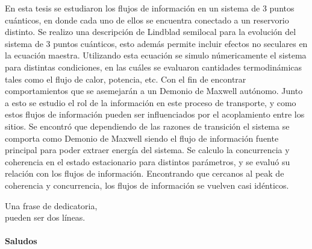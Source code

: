 \documentclass[
	spanish, %
	letterpaper, oneside
]{book}
\begin{document}
\templatePortrait

\templatePagecfg

\begin{abstractd}
	En esta tesis se estudiaron los flujos de información en un sistema de 3 puntos cuánticos, en donde cada uno de ellos se encuentra conectado a un reservorio distinto. Se realizo una descripción de Lindblad semilocal para la evolución del sistema de 3 puntos cuánticos, esto además permite incluir efectos no seculares en la ecuación maestra. Utilizando esta ecuación se simulo númericamente el sistema para distintas condiciones, en las cuáles se evaluaron cantidades termodinámicas tales como el flujo de calor, potencia, etc. Con el fin de encontrar comportamientos que se asemejarán a un Demonio de Maxwell autónomo. Junto a esto se estudio el rol de la información en este proceso de transporte, y como estos flujos de información pueden ser influenciados por el acoplamiento entre los sitios. Se encontró que dependiendo de las razones de transición el sistema se comporta como Demonio de Maxwell siendo el flujo de información fuente principal para poder extraer energía del sistema. Se calculo la concurrencia y coherencia en el estado estacionario para distintos parámetros, y se evaluó su relación con los flujos de información. Encontrando que cercanos al peak de coherencia y concurrencia, los flujos de información se vuelven casi idénticos.
\end{abstractd}

\begin{dedicatory}
	Una frase de dedicatoria, \\
	pueden ser dos líneas. \\
	~ \\
	\textbf{Saludos}
\end{dedicatory}

\begin{acknowledgments}
	\lipsum[1]
\end{acknowledgments}

\templateIndex

\templateFinalcfg



\end{document}
